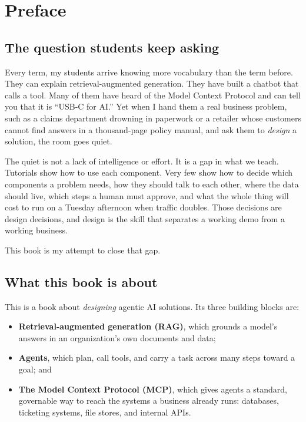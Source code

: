\chapter*{Preface}

\section*{The question students keep asking}

Every term, my students arrive knowing more vocabulary than the term before.
They can explain retrieval-augmented generation. They have built a chatbot
that calls a tool. Many of them have heard of the Model Context Protocol and
can tell you that it is ``USB-C for AI.'' Yet when I hand them a real business
problem, such as a claims department drowning in paperwork or a retailer whose
customers cannot find answers in a thousand-page policy manual, and ask them to
\emph{design} a solution, the room goes quiet.

The quiet is not a lack of intelligence or effort. It is a gap in what we
teach. Tutorials show how to use each component. Very few show how to decide
which components a problem needs, how they should talk to each other, where
the data should live, which steps a human must approve, and what the whole
thing will cost to run on a Tuesday afternoon when traffic doubles. Those
decisions are design decisions, and design is the skill that separates a
working demo from a working business.

This book is my attempt to close that gap.

\section*{What this book is about}

This is a book about \emph{designing} agentic AI solutions. Its three building
blocks are:

\begin{itemize}
  \item \textbf{Retrieval-augmented generation (RAG)}, which grounds a model's
        answers in an organization's own documents and data;
  \item \textbf{Agents}, which plan, call tools, and carry a task across many
        steps toward a goal; and
  \item \textbf{The Model Context Protocol (MCP)}, which gives agents a standard,
        governable way to reach the systems a business already runs: databases,
        ticketing systems, file stores, and internal APIs.
\end{itemize}

